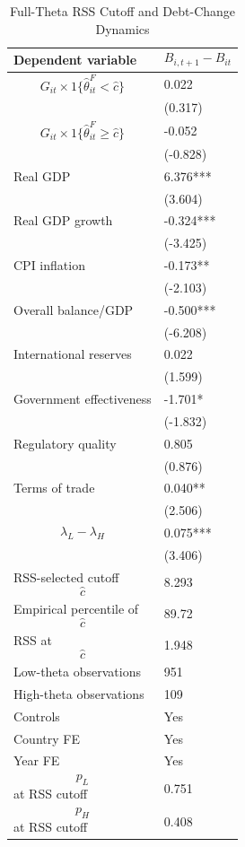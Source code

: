 \begin{table}[H]\centering
\begin{threeparttable}
\caption{Full-Theta RSS Cutoff and Debt-Change Dynamics}
\label{tab:deltaB_rss_cutoff_fulltheta}
\scriptsize
\begin{tabularx}{\textwidth}{lY}
\toprule
Dependent variable & $$B_{i,t+1}-B_{it}$$ \\
\midrule
$$G_{it}\times 1\{\widehat{\theta}^{F}_{it}<\widehat{c}\}$$ & 0.022 \\
 & (0.317) \\
$$G_{it}\times 1\{\widehat{\theta}^{F}_{it}\geq\widehat{c}\}$$ & -0.052 \\
 & (-0.828) \\
Real GDP & 6.376*** \\
 & (3.604) \\
Real GDP growth & -0.324*** \\
 & (-3.425) \\
CPI inflation & -0.173** \\
 & (-2.103) \\
Overall balance/GDP & -0.500*** \\
 & (-6.208) \\
International reserves & 0.022 \\
 & (1.599) \\
Government effectiveness & -1.701* \\
 & (-1.832) \\
Regulatory quality & 0.805 \\
 & (0.876) \\
Terms of trade & 0.040** \\
 & (2.506) \\
$$\lambda_L-\lambda_H$$ & 0.075*** \\
 & (3.406) \\
\midrule
RSS-selected cutoff $$\widehat{c}$$ & 8.293 \\
Empirical percentile of $$\widehat{c}$$ & 89.72 \\
RSS at $$\widehat{c}$$ & 1.948 \\
Low-theta observations & 951 \\
High-theta observations & 109 \\
Controls & Yes \\
Country FE & Yes \\
Year FE & Yes \\
$$p_L$$ at RSS cutoff & 0.751 \\
$$p_H$$ at RSS cutoff & 0.408 \\

\end{tabularx}
\end{threeparttable}
\end{table}
